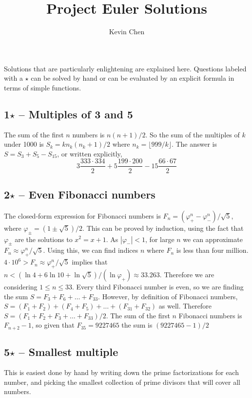 \documentclass{article}
\title{Project Euler Solutions}
\author{Kevin Chen}
\begin{document}
\maketitle

Solutions that are particularly enlightening are explained here. 
Questions labeled with a $\star$ can be solved by hand or can be evaluated by an explicit formula in terms of simple functions. \\

\subsection*{1$\star$ -- Multiples of 3 and 5} 
The sum of the first $n$ numbers is $n(n+1)/2$. 
So the sum of the multiples of $k$ under 1000 is $S_k = k n_k(n_k+1)/2$ where $n_k=\lfloor 999/k \rfloor$. 
The answer is $S = S_3 + S_5 - S_{15}$, or written explicitly,
\[ \boxed{ 3\frac{333 \cdot 334}{2} + 5\frac{199 \cdot 200}{2} - 15\frac{66 \cdot 67}{2} } \]

\subsection*{2$\star$ -- Even Fibonacci numbers} 
The closed-form expression for Fibonacci numbers is $F_n = (\varphi_+^n - \varphi_-^n)/\sqrt{5}$, where $\varphi_\pm = (1\pm\sqrt{5})/2$.
This can be proved by induction, using the fact that $\varphi_\pm$ are the solutions to $x^2 = x + 1$.
As $|\varphi_-| < 1$, for large $n$ we can approximate $F_n \approx \varphi_+^n/\sqrt{5}$. 
Using this, we can find indices $n$ where $F_n$ is less than four million. 
$4 \cdot 10^6 > F_n \approx \varphi_+^n/\sqrt{5}$ implies that $n < (\ln 4 + 6 \ln 10 + \ln \sqrt{5})/(\ln \varphi_+) \approx 33.263$. 
Therefore we are considering $1 \leq n \leq 33$. 
Every third Fibonacci number is even, so we are finding the sum $S = F_3 + F_6 + \dotso + F_{33}$. 
However, by definition of Fibonacci numbers, $S = (F_1 + F_2) + (F_4 + F_5) + \dotso + (F_{31} + F_{32})$ as well. 
Therefore $S = (F_1 + F_2 + F_3 + \dotso + F_{33})/2$. 
The sum of the first $n$ Fibonacci numbers is $F_{n+2} - 1$, so given that $F_{35} = 9227465$ the sum is $\boxed{ (9227465 - 1)/2 }$

\subsection*{5$\star$ -- Smallest multiple} 
This is easiest done by hand by writing down the prime factorizations for each number, and picking the smallest collection of prime divisors that will cover all numbers.
\end{document}
